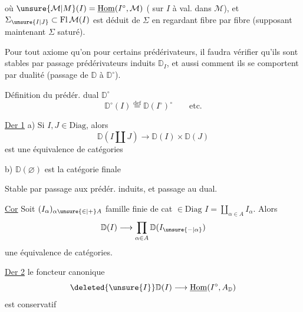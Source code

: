 où $\unsure{\mathcal M|M}(I)=\underline{\mathrm{Hom}}(I^\circ,\mathcal M)$ ( sur $I$ à val. dans $\mathcal M$), et $\Sigma_{\unsure{I|J}}\subset\mathrm{Fl}\,\mathcal M(I)$ est déduit de $\Sigma$ en regardant fibre par fibre (supposant maintenant $\Sigma$ saturé).

Pour tout axiome qu'on  pour certains prédérivateurs, il faudra vérifier qu'ils sont stables par passage  prédérivateurs induits $\mathbb D_I$, et aussi  comment ils se comportent par dualité (passage de $\mathbb D$ à $\mathbb D^\circ$).

Définition du prédér. dual $\mathbb D^\circ$
\[
 \mathbb D^\circ(I)\overset{\mathrm{def}}{=}\mathbb D(I^\circ)^\circ\qquad\text{etc.}
\]

\uline{Der 1} \quad a) Si $I,J\in\mathrm{Diag}$, alors
\[
 \mathbb D(I\amalg J)\longrightarrow\mathbb D(I)\times\mathbb D(J)
\]
est une équivalence de catégories

b) $\mathbb D(\varnothing)$ est la catégorie finale

Stable par passage aux prédér. induits, et passage au dual.

\uline{Cor} \quad Soit $(I_\alpha)_{\alpha\unsure{\in|+}A}$ famille finie de cat $\in\mathrm{Diag}$ $I=\coprod_{\alpha\in A}I_\alpha$. Alors
\[
 \mathbb D(I)\longrightarrow\prod_{\alpha\in A}\mathbb D(I_{\unsure{-|\alpha}})
\]
une équivalence de catégories.

\uline{Der 2} \quad {} le foncteur canonique
\[
 \deleted{\unsure{I}}\mathbb D(I)\longrightarrow\underline{\mathrm{Hom}}(I^\circ,A_{\mathbb D})
\]
est conservatif
